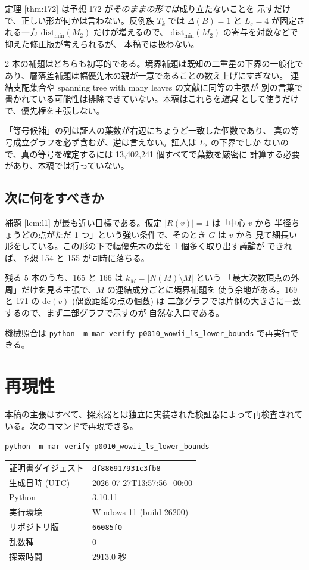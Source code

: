\documentclass[paper=a4,fontsize=10.5pt,jafontsize=10.5pt]{jlreq}
\theoremstyle{plain}
\theoremstyle{definition}
\begin{document}
定理 \ref{thm:172} は予想 172 が\emph{そのままの形では}成り立たないことを
示すだけで、正しい形が何かは言わない。反例族 $T_k$ では $\Delta(B) = 1$ と
$L_s = 4$ が固定される一方 $\mathrm{dist}_{\min}(M_2)$ だけが増えるので、
$\mathrm{dist}_{\min}(M_2)$ の寄与を対数などで抑えた修正版が考えられるが、
本稿では扱わない。

2 本の補題はどちらも初等的である。境界補題は既知の二重星の下界の一般化で
あり、層落差補題は幅優先木の親が一意であることの数え上げにすぎない。
連結支配集合や spanning tree with many leaves の文献に同等の主張が
別の言葉で書かれている可能性は排除できていない。本稿はこれらを\emph{道具}
として使うだけで、優先権を主張しない。

「等号候補」の列は証人の葉数が右辺にちょうど一致した個数であり、
真の等号成立グラフを必ず含むが、逆は言えない。証人は $L_s$ の下界でしか
ないので、真の等号を確定するには 13,402,241 個すべてで葉数を厳密に
計算する必要があり、本稿では行っていない。

\subsection*{次に何をすべきか}

補題 \ref{lem:l1} が最も近い目標である。仮定 $|R(v)| = 1$ は「中心 $v$ から
半径ちょうどの点がただ 1 つ」という強い条件で、そのとき $G$ は $v$ から
見て細長い形をしている。この形の下で幅優先木の葉を 1 個多く取り出す議論が
できれば、予想 154 と 155 が同時に落ちる。

残る 5 本のうち、165 と 166 は $k_M = |N(M) \setminus M|$ という
「最大次数頂点の外周」だけを見る主張で、$M$ の連結成分ごとに境界補題を
使う余地がある。169 と 171 の $\mathrm{de}(v)$ (偶数距離の点の個数) は
二部グラフでは片側の大きさに一致するので、まず二部グラフで示すのが
自然な入口である。

\medskip
\noindent
機械照合は \texttt{python -m mar verify p0010\_wowii\_ls\_lower\_bounds} で再実行できる。


\section*{再現性}
本稿の主張はすべて、探索器とは独立に実装された検証器によって再検査されている。次のコマンドで再現できる。

\begin{center}\texttt{python -m mar verify p0010\_wowii\_ls\_lower\_bounds}\end{center}

\begin{center}\begin{tabular}{ll}\toprule
証明書ダイジェスト & \texttt{df886917931c3fb8} \\
生成日時 (UTC) & 2026-07-27T13:57:56+00:00 \\
Python & 3.10.11 \\
実行環境 & Windows 11 (build 26200) \\
リポジトリ版 & \texttt{66085f0} \\
乱数種 & 0 \\
探索時間 & 2913.0 秒 \\
\bottomrule\end{tabular}\end{center}
\end{document}
